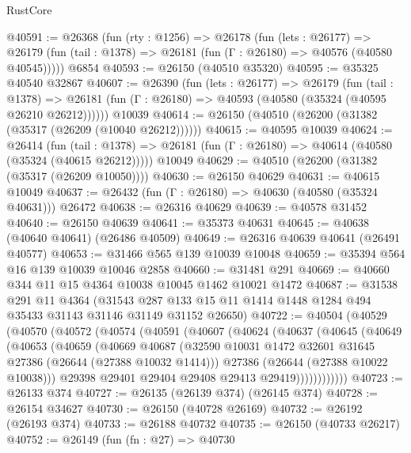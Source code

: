 \begin{lexlean}{RustCore}
\begin{coremodule}
@40591 := @26368
    (fun (rty : @1256) =>
    @26178
      (fun (lets : @26177) =>
      @26179 (fun (tail : @1378) => @26181 (fun (Γ : @26180) => @40576 (@40580 @40545)))))
    @6854
@40593 := @26150 (@40510 @35320)
@40595 := @35325 @40540 @32867
@40607 := @26390
    (fun (lets : @26177) =>
    @26179
      (fun (tail : @1378) =>
      @26181 (fun (Γ : @26180) => @40593 (@40580 (@35324 (@40595 @26210 @26212))))))
    @10039
@40614 := @26150 (@40510 (@26200 (@31382 (@35317 (@26209 (@10040 @26212))))))
@40615 := @40595 @10039
@40624 := @26414
    (fun (tail : @1378) => @26181 (fun (Γ : @26180) => @40614 (@40580 (@35324 (@40615 @26212)))))
    @10049
@40629 := @40510 (@26200 (@31382 (@35317 (@26209 @10050))))
@40630 := @26150 @40629
@40631 := @40615 @10049
@40637 := @26432 (fun (Γ : @26180) => @40630 (@40580 (@35324 @40631))) @26472
@40638 := @26316 @40629
@40639 := @40578 @31452
@40640 := @26150 @40639
@40641 := @35373 @40631
@40645 := @40638 (@40640 @40641) (@26486 @40509)
@40649 := @26316 @40639 @40641 (@26491 @40577)
@40653 := @31466 @565 @139 @10039 @10048
@40659 := @35394 @564 @16 @139 @10039 @10046 @2858
@40660 := @31481 @291
@40669 := @40660 @344 @11 @15 @4364 @10038 @10045 @1462 @10021 @1472
@40687 := @31538
    @291
    @11
    @4364
    (@31543 @287 @133 @15 @11 @1414 @1448 @1284 @494 @35433 @31143 @31146 @31149 @31152 @26650)
@40722 := @40504
    (@40529
      (@40570
        (@40572
          (@40574
            (@40591
              (@40607
                (@40624
                  (@40637
                    (@40645
                      (@40649
                        (@40653
                          (@40659
                            (@40669
                              @40687
                              (@32590
                                @10031
                                @1472
                                @32601
                                @31645
                                @27386
                                (@26644 (@27388 @10032 @1414)))
                              @27386
                              (@26644 (@27388 @10022 @10038)))
                            @29398
                            @29401
                            @29404
                            @29408
                            @29413
                            @29419))))))))))))
@40723 := @26133 @374
@40727 := @26135 (@26139 @374) (@26145 @374)
@40728 := @26154 @34627
@40730 := @26150 (@40728 @26169)
@40732 := @26192 (@26193 @374)
@40733 := @26188 @40732
@40735 := @26150 (@40733 @26217)
@40752 := @26149
    (fun (fn : @27) =>
    @40730

\end{coremodule}
\end{lexlean}
